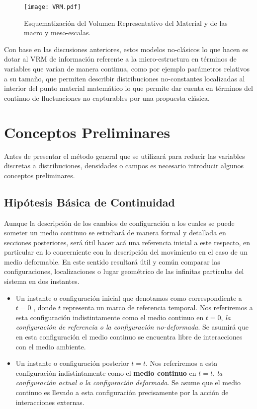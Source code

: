 \documentclass[../notas medios.tex]{subfiles}
\begin{document}
\begin{figure}[H]
\centering
\texttt{[image: VRM.pdf]}
\caption{Esquematización del Volumen Representativo del Material y de las macro 
y meso-escalas.}
\label{fig:VRM}
\end{figure}

Con base en las discusiones anteriores, estos modelos no-clásicos lo que hacen 
es dotar al VRM de información referente a la micro-estructura en términos de 
variables que varían de manera continua, como por ejemplo parámetros relativos 
a su tamaño, que permiten describir distribuciones no-constantes localizadas al 
interior del punto material matemático lo que permite dar cuenta en términos 
del continuo de fluctuaciones no capturables por una propuesta clásica.

\section{Conceptos Preliminares}
Antes de presentar el método general que se utilizará para reducir las variables discretas a distribuciones, densidades o campos es necesario introducir algunos conceptos preliminares.

\subsection{Hipótesis Básica de Continuidad}
Aunque la descripción de los cambios de configuración a los cuales se puede 
someter un medio continuo se estudiará de manera formal y detallada en 
secciones posteriores, será útil hacer acá una referencia inicial a este 
respecto, en particular en lo concerniente con la descripción del movimiento en 
el caso de un medio deformable.  En este sentido resultará útil y común 
comparar las configuraciones, localizaciones o lugar geométrico de las 
infinitas partículas del sistema en dos instantes.

\begin{itemize}
\item Un instante o configuración inicial que denotamos como correspondiente a 
$t=0$ , donde $t$ representa un marco de referencia temporal.  Nos referiremos 
a esta configuración indistintamente como el medio continuo en $t=0$, 
\textit{la configuración de referencia o la configuración no-deformada}.  Se 
asumirá que en esta configuración el medio continuo se encuentra libre de 
interacciones con el medio ambiente.

\item Un instante o configuración posterior $t=t$. Nos referiremos a esta 
configuración indistintamente como el {\bf medio continuo} en $t=t$, \textit{la 
configuración actual o la configuración deformada}. Se asume que el medio 
continuo es llevado a esta configuración precisamente por la acción de 
interacciones externas.

\end{itemize}
\end{document}
